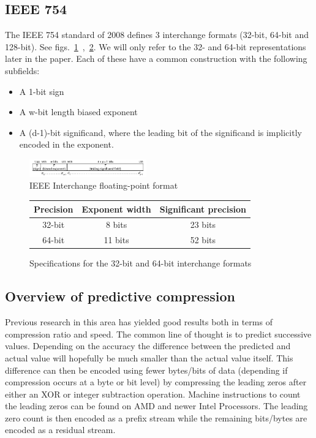 \documentclass{acm_proc_article-sp}
\begin{document}
\subsection{IEEE 754}
The IEEE 754 standard of 2008 defines 3 interchange formats (32-bit, 64-bit and 128-bit). See figs.~\ref{IEEE_FLOAT}~,~\ref{IEEE_FLOAT_TAB}. We will only refer to the 32- and 64-bit representations later in the paper.  
Each of these have a common construction with the following subfields:
\begin{itemize}
 \item A 1-bit sign
 \item A w-bit length biased exponent
 \item A (d-1)-bit significand, where the leading bit of the significand is implicitly encoded in the exponent.
\end{itemize}
\begin{figure}[h!]
 \includegraphics[width=0.45\textwidth]{IEEEinterchangeFormat.png}
 \caption{IEEE Interchange floating-point format \cite{4610935}}
 \label{IEEE_FLOAT}
\end{figure}
\begin{figure}[h!]
\centering
\begin{tabular}{|c|c|c|}
 \hline
 Precision & Exponent width & Significant precision \\
 \hline
 32-bit & 8 bits & 23 bits \\
 \hline
 64-bit & 11 bits & 52 bits \\
 \hline
\end{tabular}
\caption{Specifications for the 32-bit and 64-bit interchange formats}
 \label{IEEE_FLOAT_TAB}
\end{figure}
\subsection{Overview of predictive compression}
Previous research \cite{1607248,4589203,engelson2000lossless,lindstrom2006fast,O'Neil:2011:FDC:1964179.1964189,4976448} in this area has yielded good results both in terms of compression ratio and speed. 
The common line of thought is to predict successive values. Depending on the accuracy the difference between the predicted and actual value will hopefully be much smaller than the actual value itself. 
This difference can then be encoded using fewer bytes/bits of data (depending if compression occurs at a byte or bit level) by compressing the leading zeros after either an XOR or integer subtraction 
operation. Machine instructions to count the leading zeros can be found on AMD and newer Intel Processors. The leading zero count is then encoded as a prefix stream while the remaining bits/bytes 
are encoded as a residual stream.
\end{document}
